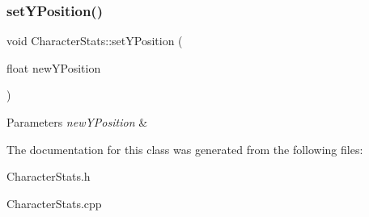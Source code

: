 \subsubsection{\texorpdfstring{setYPosition()}{setYPosition()}}
{\footnotesize\ttfamily void Character\+Stats\+::set\+Y\+Position (\begin{DoxyParamCaption}\item[{float}]{new\+Y\+Position }\end{DoxyParamCaption})\hspace{0.3cm}{\ttfamily [inline]}}


\begin{DoxyParams}{Parameters}
{\em new\+Y\+Position} & \\
\hline
\end{DoxyParams}


The documentation for this class was generated from the following files\+:\begin{DoxyCompactItemize}
\item 
Character\+Stats.\+h\item 
Character\+Stats.\+cpp\end{DoxyCompactItemize}
